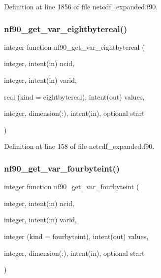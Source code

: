 Definition at line 1856 of file netcdf\+\_\+expanded.\+f90.

\mbox{\label{netcdf__expanded_8f90_ac83fc3cd89b07643fe7a144cace5811b}} 
\subsubsection{\texorpdfstring{nf90\+\_\+get\+\_\+var\+\_\+eightbytereal()}{nf90\_get\_var\_eightbytereal()}}
{\footnotesize\ttfamily integer function nf90\+\_\+get\+\_\+var\+\_\+eightbytereal (\begin{DoxyParamCaption}\item[{integer, intent(in)}]{ncid,  }\item[{integer, intent(in)}]{varid,  }\item[{real (kind = eightbytereal), intent(out)}]{values,  }\item[{integer, dimension(\+:), intent(in), optional}]{start }\end{DoxyParamCaption})}



Definition at line 158 of file netcdf\+\_\+expanded.\+f90.

\mbox{\label{netcdf__expanded_8f90_aa5d3ca05a9381711a859ab4712dc7b2d}} 
\subsubsection{\texorpdfstring{nf90\+\_\+get\+\_\+var\+\_\+fourbyteint()}{nf90\_get\_var\_fourbyteint()}}
{\footnotesize\ttfamily integer function nf90\+\_\+get\+\_\+var\+\_\+fourbyteint (\begin{DoxyParamCaption}\item[{integer, intent(in)}]{ncid,  }\item[{integer, intent(in)}]{varid,  }\item[{integer (kind = fourbyteint), intent(out)}]{values,  }\item[{integer, dimension(\+:), intent(in), optional}]{start }\end{DoxyParamCaption})}



